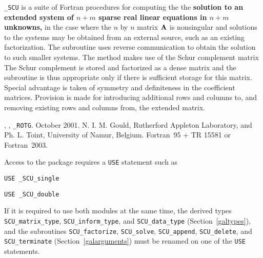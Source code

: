 \documentclass{galahad}
\newcommand{\packagename}{SCU}
\newcommand{\fullpackagename}{\libraryname\-\_\-\packagename}
\begin{document}
\galheader


\galsummary

{\tt \fullpackagename} is a suite of Fortran procedures for 
computing the 
the {\bf solution to an extended system of $n + m$ 
sparse real linear equations in $n  +  m$ unknowns,} 
in the case where the $n$ by $n$ matrix ${\mathbf{A}}$ is nonsingular 
and solutions to the systems 
may be obtained from an external source, such as an existing 
factorization.  The subroutine uses reverse communication to obtain 
the solution to such smaller systems.  The method makes use of 
the Schur complement matrix 
The Schur complement is stored and factorized as a dense matrix 
and the subroutine is thus appropriate only if there is 
sufficient storage for this matrix. Special advantage is taken 
of symmetry and definiteness in the coefficient matrices. 
Provision is made for introducing additional rows and columns 
to, and removing existing rows and columns from, the extended 
matrix. 
 

\galattributes
\galversions{\tt  \fullpackagename\_single, \fullpackagename\_double},
, {\tt \_ROTG}. 
\galdate October 2001.
\galorigin N. I. M. Gould, Rutherford Appleton Laboratory, and
Ph. L. Toint, University of Namur, Belgium.
\gallanguage Fortran~95 + TR 15581 or Fortran~2003. 


\galhowto

Access to the package requires a {\tt USE} statement such as

\medskip{}

\hskip0.5in {\tt USE \fullpackagename\_single}

\medskip{}

\hskip0.5in {\tt USE  \fullpackagename\_double}

\medskip

\noindent
If it is required to use both modules at the same time, the derived types 
{\tt \packagename\_matrix\_type}, 
{\tt \packagename\_inform\_type}, and
{\tt \packagename\_data\_type} 
(Section~\ref{galtypes}),
and the subroutines
{\tt \packagename\_factorize},  
{\tt \packagename\_solve},  
{\tt \packagename\_append},  
{\tt \packagename\_delete}, 
and 
{\tt \packagename\_terminate} 
(Section~\ref{galarguments})
must be renamed on one of the {\tt USE} statements.
\end{document}
